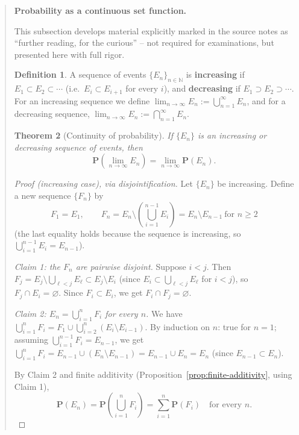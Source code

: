 \documentclass[11pt]{article}
\theoremstyle{definition}
\newtheorem{definition}{Definition}[section]
\theoremstyle{plain}
\newtheorem{theorem}[definition]{Theorem}
\theoremstyle{remark}
\newenvironment{extra}[1][Supplementary Material (beyond the core syllabus)]{%
  \begin{quote}\color{red}\noindent\textbf{#1.}\par\smallskip
}{%
  \end{quote}
}
\newcommand{\N}{\mathbb{N}}
\begin{document}
\begin{extra}[Probability as a continuous set function]
This subsection develops material explicitly marked in the source notes as ``further reading, for
the curious'' -- not required for examinations, but presented here with full rigor.

\begin{definition}
A sequence of events $\{E_n\}_{n\in\N}$ is \textbf{increasing} if $E_1 \subset E_2 \subset \cdots$
(i.e.\ $E_i \subset E_{i+1}$ for every $i$), and \textbf{decreasing} if
$E_1 \supset E_2 \supset \cdots$. For an increasing sequence we define
$\displaystyle \lim_{n\to\infty} E_n := \bigcup_{n=1}^\infty E_n$, and for a decreasing sequence,
$\displaystyle \lim_{n\to\infty} E_n := \bigcap_{n=1}^\infty E_n$.
\end{definition}

\begin{theorem}[Continuity of probability]
\label{thm:continuity-prob}
If $\{E_n\}$ is an increasing or decreasing sequence of events, then
\[
\mathbf{P}\left(\lim_{n\to\infty}E_n\right) = \lim_{n\to\infty}\mathbf{P}(E_n).
\]
\end{theorem}

\begin{proof}[Proof (increasing case), via disjointification]
Let $\{E_n\}$ be increasing. Define a new sequence $\{F_n\}$ by
\[
F_1 = E_1, \qquad F_n = E_n \setminus \left(\bigcup_{i=1}^{n-1}E_i\right) = E_n \setminus E_{n-1}
\ \text{for } n \ge 2
\]
(the last equality holds because the sequence is increasing, so $\bigcup_{i=1}^{n-1}E_i=E_{n-1}$).

\emph{Claim 1: the $F_n$ are pairwise disjoint.} Suppose $i<j$. Then $F_j = E_j \setminus
\bigcup_{\ell<j}E_\ell \subset E_j \setminus E_i$ (since $E_i \subset \bigcup_{\ell<j}E_\ell$ for
$i<j$), so $F_j \cap E_i = \varnothing$. Since $F_i \subset E_i$, we get $F_i \cap F_j = \varnothing$.

\emph{Claim 2: $E_n = \bigcup_{i=1}^n F_i$ for every $n$.} We have
$\bigcup_{i=1}^n F_i = F_1 \cup \bigcup_{i=2}^n (E_i \setminus E_{i-1})$. By induction on $n$: true
for $n=1$; assuming $\bigcup_{i=1}^{n-1}F_i = E_{n-1}$, we get
$\bigcup_{i=1}^n F_i = E_{n-1} \cup (E_n \setminus E_{n-1}) = E_{n-1}\cup E_n = E_n$ (since
$E_{n-1}\subset E_n$).

By Claim 2 and finite additivity (Proposition~\ref{prop:finite-additivity}, using Claim 1),
\begin{equation}
\mathbf{P}(E_n) = \mathbf{P}\left(\bigcup_{i=1}^n F_i\right) = \sum_{i=1}^n \mathbf{P}(F_i)
\quad \text{for every } n. \tag{$\ast$}
\end{equation}


\end{proof}
\end{extra}
\end{document}

